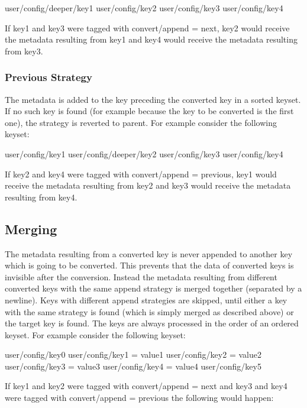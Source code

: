 \begin{DoxyCode}
user/config/deeper/key1
user/config/key2
user/config/key3
user/config/key4
\end{DoxyCode}


If key1 and key3 were tagged with {\ttfamily convert/append = next}, key2 would receive the metadata resulting from key1 and key4 would receive the metadata resulting from key3.

\subsubsection*{Previous Strategy}

The metadata is added to the key preceding the converted key in a sorted keyset. If no such key is found (for example because the key to be converted is the first one), the strategy is reverted to parent. For example consider the following keyset\+:


\begin{DoxyCode}
user/config/key1
user/config/deeper/key2
user/config/key3
user/config/key4
\end{DoxyCode}


If key2 and key4 were tagged with {\ttfamily convert/append = previous}, key1 would receive the metadata resulting from key2 and key3 would receive the metadata resulting from key4.

\subsection*{Merging}

The metadata resulting from a converted key is never appended to another key which is going to be converted. This prevents that the data of converted keys is invisible after the conversion. Instead the metadata resulting from different converted keys with the same append strategy is merged together (separated by a newline). Keys with different append strategies are skipped, until either a key with the same strategy is found (which is simply merged as described above) or the target key is found. The keys are always processed in the order of an ordered keyset. For example consider the following keyset\+:


\begin{DoxyCode}
user/config/key0
user/config/key1 = value1
user/config/key2 = value2
user/config/key3 = value3
user/config/key4 = value4
user/config/key5
\end{DoxyCode}


If key1 and key2 were tagged with {\ttfamily convert/append = next} and key3 and key4 were tagged with {\ttfamily convert/append = previous} the following would happen\+:


